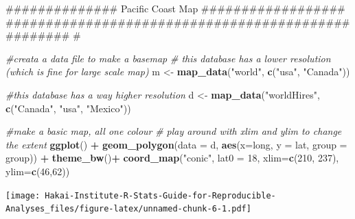 \documentclass[]{book}
\newenvironment{Shaded}{\begin{snugshade}}{\end{snugshade}}
\newcommand{\KeywordTok}[1]{\textcolor[rgb]{0.13,0.29,0.53}{\textbf{#1}}}
\newcommand{\DataTypeTok}[1]{\textcolor[rgb]{0.13,0.29,0.53}{#1}}
\newcommand{\DecValTok}[1]{\textcolor[rgb]{0.00,0.00,0.81}{#1}}
\newcommand{\StringTok}[1]{\textcolor[rgb]{0.31,0.60,0.02}{#1}}
\newcommand{\CommentTok}[1]{\textcolor[rgb]{0.56,0.35,0.01}{\textit{#1}}}
\newcommand{\OperatorTok}[1]{\textcolor[rgb]{0.81,0.36,0.00}{\textbf{#1}}}
\newcommand{\NormalTok}[1]{#1}
\begin{document}
\begin{Shaded}
\begin{Highlighting}[]
\NormalTok{############## Pacific Coast Map ##################}
\NormalTok{################################################### #}


\CommentTok{#creata a data file to make a basemap}
\CommentTok{# this database has a lower resolution (which is fine for large scale map)}
\NormalTok{m <-}\StringTok{ }\KeywordTok{map_data}\NormalTok{(}\StringTok{"world"}\NormalTok{, }\KeywordTok{c}\NormalTok{(}\StringTok{"usa"}\NormalTok{, }\StringTok{"Canada"}\NormalTok{))}

\CommentTok{#this database has a way higher resolution}
\NormalTok{d <-}\StringTok{ }\KeywordTok{map_data}\NormalTok{(}\StringTok{"worldHires"}\NormalTok{, }\KeywordTok{c}\NormalTok{(}\StringTok{"Canada"}\NormalTok{, }\StringTok{"usa"}\NormalTok{, }\StringTok{"Mexico"}\NormalTok{))}

\CommentTok{#make a basic map, all one colour}
\CommentTok{# play around with xlim and ylim to change the extent}
\KeywordTok{ggplot}\NormalTok{() }\OperatorTok{+}\StringTok{ }\KeywordTok{geom_polygon}\NormalTok{(}\DataTypeTok{data =}\NormalTok{ d, }\KeywordTok{aes}\NormalTok{(}\DataTypeTok{x=}\NormalTok{long, }\DataTypeTok{y =}\NormalTok{ lat, }\DataTypeTok{group =}\NormalTok{ group)) }\OperatorTok{+}\StringTok{ }\KeywordTok{theme_bw}\NormalTok{()}\OperatorTok{+}
\StringTok{  }\KeywordTok{coord_map}\NormalTok{(}\StringTok{"conic"}\NormalTok{, }\DataTypeTok{lat0 =} \DecValTok{18}\NormalTok{, }\DataTypeTok{xlim=}\KeywordTok{c}\NormalTok{(}\DecValTok{210}\NormalTok{, }\DecValTok{237}\NormalTok{), }\DataTypeTok{ylim=}\KeywordTok{c}\NormalTok{(}\DecValTok{46}\NormalTok{,}\DecValTok{62}\NormalTok{))}
\end{Highlighting}
\end{Shaded}

\texttt{[image: Hakai-Institute-R-Stats-Guide-for-Reproducible-Analyses\_files/figure-latex/unnamed-chunk-6-1.pdf]}
\end{document}
